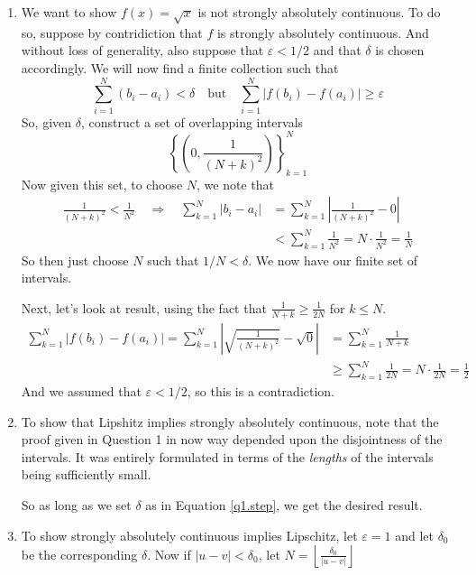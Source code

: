 \documentclass[12pt]{article}
\theoremstyle{plain}
\theoremstyle{definition}
\theoremstyle{remark}
\begin{document}
\begin{enumerate}
\begin{enumerate}
\begin{enumerate}
\item We want to show $f(x)=\sqrt{x}$ is not strongly absolutely continuous. To do so, suppose by contridiction that $f$ is strongly absolutely continuous. And without loss of generality, also suppose that $\varepsilon<1/2$ and that $\delta$ is chosen accordingly. We will now find a finite collection such that
\[
    \sum_{i=1}^N (b_i-a_i) < \delta
    \quad\text{but}\quad
    \sum_{i=1}^N |f(b_i)-f(a_i)| \geq \varepsilon 
\]
So, given $\delta$, construct a set of overlapping intervals 
\[
    \left\{\left(0,\frac{1}{(N+k)^2}\right)\right\}^N_{k=1}
\]
Now given this set, to choose $N$, we note that
\begin{align*}
    \frac{1}{(N+k)^2} <  \frac{1}{N^2}  
    \quad\Rightarrow\quad
    \sum_{k=1}^N |b_i-a_i| &=
    \sum_{k=1}^N \left\lvert\frac{1}{(N+k)^2}-0\right\rvert \\
    &<\sum_{k=1}^N \frac{1}{N^2}
     =N\cdot \frac{1}{N^2} = \frac{1}{N}
\end{align*}
So then just choose $N$ such that $1/N < \delta$. We now have our finite set of intervals. 

Next, let's look at result, using the fact that $\frac{1}{N+k} \geq \frac{1}{2N} $ for $k\leq N$. 
\begin{align*}
    \sum_{k=1}^N |f(b_i)-f(a_i)| = \sum_{k=1}^N 
    \left\lvert \sqrt{\frac{1}{(N+k)^2}} - \sqrt{0}\right\rvert
    &= \sum_{k=1}^N {\frac{1}{N+k}}  \\
    &\geq \sum_{k=1}^N {\frac{1}{2N}}  = N\cdot \frac{1}{2N} = \frac{1}{2}
\end{align*}
And we assumed that $\varepsilon<1/2$, so this is a contradiction. 


\item To show that Lipshitz implies strongly absolutely continuous, note that the proof given in Question 1 in now way depended upon the disjointness of the intervals. It was entirely formulated in terms of the \emph{lengths} of the intervals being sufficiently small. 

So as long as we set $\delta$ as in Equation \ref{q1.step}, we get the desired result.

\item To show strongly absolutely continuous implies Lipschitz, let $\varepsilon=1$ and let $\delta_0$ be the corresponding $\delta$. Now if $|u-v|<\delta_0$, let $N=\left\lfloor{\frac{\delta_0}{|u-v|}}\right\rfloor$





\end{enumerate} 


\end{enumerate} 


\end{enumerate} 
\end{document}
